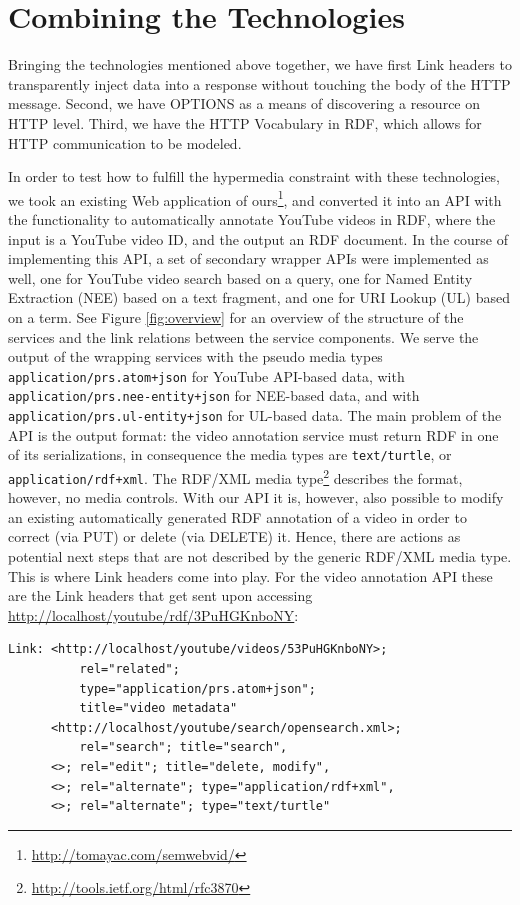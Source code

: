 \documentclass{acm_proc_article-sp}
\begin{document}
\section{Combining the Technologies}\label{sec:implementation}
Bringing the technologies mentioned above together, we have first Link headers to transparently inject data into a response without touching the body of the HTTP message. Second, we have OPTIONS as a means of discovering a resource on HTTP level. Third, we have the HTTP Vocabulary in RDF, which allows for HTTP communication to be modeled.

In order to test how to fulfill the hypermedia constraint with these technologies, we took an existing Web application of ours\footnote{\url{http://tomayac.com/semwebvid/}}, and converted it into an API with the functionality to automatically annotate YouTube videos in RDF, where the input is a YouTube video ID, and the output an RDF document. In the course of implementing this API, a set of secondary wrapper APIs were implemented as well, one for YouTube video search based on a query, one for Named Entity Extraction (NEE) based on a text fragment, and one for URI Lookup (UL) based on a term. See Figure \ref{fig:overview} for an overview of the structure of the services and the link relations between the service components. We serve the output of the wrapping services with the pseudo media types \texttt{application/prs.atom+json} for YouTube API-based data, with \texttt{application/prs.nee-entity+json} for NEE-based data, and with \texttt{application/prs.ul-entity+json} for UL-based data. The main problem of the API is the output format: the video annotation service must return RDF in one of its serializations, in consequence the media types are \texttt{text/turtle}, or \texttt{application/rdf+xml}. The RDF/XML media type\footnote{\url{http://tools.ietf.org/html/rfc3870}} describes the format, however, no media controls. With our API it is, however, also possible to modify an existing automatically generated RDF annotation of a video in order to correct (via PUT) or delete (via DELETE) it. Hence, there are actions as potential next steps that are not described by the generic RDF/XML media type. This is where Link headers come into play. For the video annotation API these are the Link headers that get sent upon accessing \url{http://localhost/youtube/rdf/3PuHGKnboNY}:
\begin{verbatim}
Link: <http://localhost/youtube/videos/53PuHGKnboNY>;
          rel="related";
          type="application/prs.atom+json";
          title="video metadata"
      <http://localhost/youtube/search/opensearch.xml>;
          rel="search"; title="search",
      <>; rel="edit"; title="delete, modify",
      <>; rel="alternate"; type="application/rdf+xml",
      <>; rel="alternate"; type="text/turtle"   
\end{verbatim}
\end{document}
